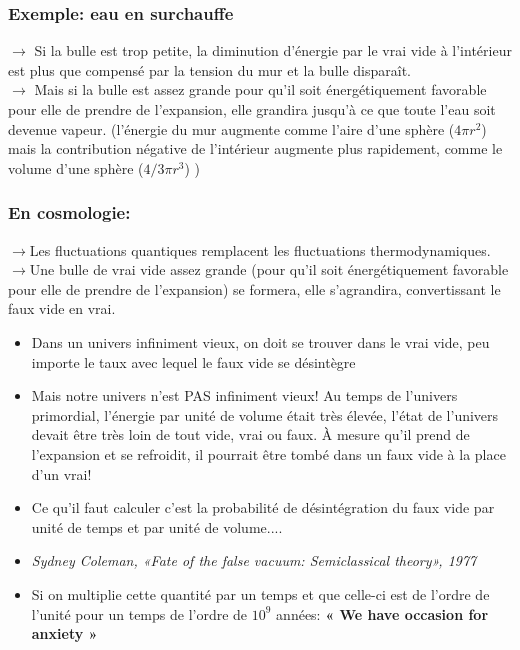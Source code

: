 \documentclass{beamer}
\begin{document}
\begin{frame}
\frametitle{Exemple: eau en surchauffe}
\begin{figure}
\end{figure}
$\rightarrow$ Si la bulle est trop petite, la diminution d'énergie par le vrai vide à l'intérieur est plus que compensé par la tension du mur et la bulle disparaît.\\
$\rightarrow$ Mais si la bulle est assez grande pour qu'il soit énergétiquement favorable pour elle de prendre de l'expansion, elle grandira jusqu'à ce que toute l'eau soit devenue vapeur. (l'énergie du mur augmente comme l'aire d'une sphère ($4 \pi r^2$) mais la contribution négative de l'intérieur augmente plus rapidement, comme le volume d'une sphère ($4/3 \pi r^3$) )
\end{frame}

\begin{frame}
\frametitle{En cosmologie:}
$\rightarrow$Les fluctuations quantiques remplacent les fluctuations thermodynamiques.\\
$\rightarrow$Une bulle de vrai vide assez grande (pour qu'il soit énergétiquement favorable pour elle de prendre de l'expansion) se formera, elle s'agrandira, convertissant le faux vide en vrai.

\begin{itemize}
\item Dans un univers infiniment vieux, on doit se trouver dans le vrai vide, peu importe le taux avec lequel le faux vide se désintègre
\item Mais notre univers n'est PAS infiniment vieux! Au temps de l'univers primordial, l'énergie par unité de volume était très élevée, l'état de l'univers devait être très loin de tout vide, vrai ou faux. À mesure qu'il prend de l'expansion et se refroidit, il pourrait être tombé dans un faux vide à la place d'un vrai!
\end{itemize}
\end{frame}


\begin{frame}
\begin{itemize}
\item<2-> Ce qu'il faut calculer c'est la probabilité de désintégration du faux vide par unité de temps et par unité de volume....
\item<3-> \textit{Sydney Coleman, «Fate of the false vacuum: Semiclassical theory», 1977} 
\item<4-> Si on multiplie cette quantité par un temps et que celle-ci est de l'ordre de l'unité pour un temps de l'ordre de $10^9$ années: \textbf{« We have occasion for anxiety »}
\end{itemize}
\end{frame}
\end{document}
